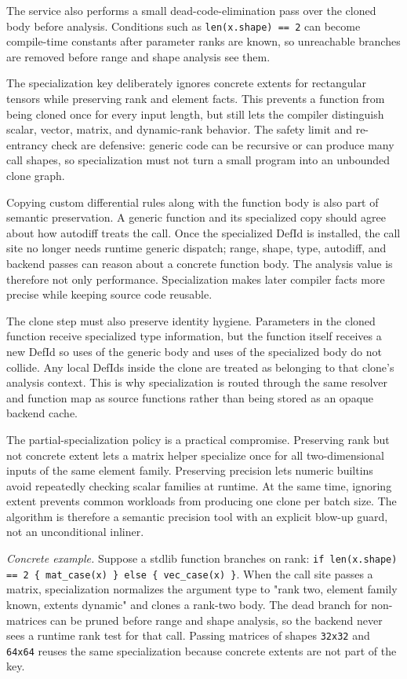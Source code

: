 The service also performs a small dead-code-elimination pass over the cloned
body before analysis. Conditions such as \texttt{len(x.shape) == 2} can become
compile-time constants after parameter ranks are known, so unreachable branches
are removed before range and shape analysis see them.

The specialization key deliberately ignores concrete extents for rectangular
tensors while preserving rank and element facts. This prevents a function from
being cloned once for every input length, but still lets the compiler
distinguish scalar, vector, matrix, and dynamic-rank behavior. The safety limit
and re-entrancy check are defensive: generic code can be recursive or can
produce many call shapes, so specialization must not turn a small program into
an unbounded clone graph.

Copying custom differential rules along with the function body is also part of
semantic preservation. A generic function and its specialized copy should agree
about how autodiff treats the call. Once the specialized DefId is installed,
the call site no longer needs runtime generic dispatch; range, shape, type,
autodiff, and backend passes can reason about a concrete function body. The
analysis value is therefore not only performance. Specialization makes later
compiler facts more precise while keeping source code reusable.

The clone step must also preserve identity hygiene. Parameters in the cloned
function receive specialized type information, but the function itself receives
a new DefId so uses of the generic body and uses of the specialized body do not
collide. Any local DefIds inside the clone are treated as belonging to that
clone's analysis context. This is why specialization is routed through the same
resolver and function map as source functions rather than being stored as an
opaque backend cache.

The partial-specialization policy is a practical compromise. Preserving rank but
not concrete extent lets a matrix helper specialize once for all two-dimensional
inputs of the same element family. Preserving precision lets numeric builtins
avoid repeatedly checking scalar families at runtime. At the same time, ignoring
extent prevents common workloads from producing one clone per batch size. The
algorithm is therefore a semantic precision tool with an explicit blow-up
guard, not an unconditional inliner.

\textit{Concrete example.} Suppose a stdlib function branches on rank:
\texttt{if len(x.shape) == 2 \{ mat\_case(x) \} else \{ vec\_case(x) \}}. When
the call site passes a matrix, specialization normalizes the argument type to
"rank two, element family known, extents dynamic" and clones a rank-two body.
The dead branch for non-matrices can be pruned before range and shape analysis,
so the backend never sees a runtime rank test for that call. Passing matrices
of shapes \texttt{32x32} and \texttt{64x64} reuses the same specialization
because concrete extents are not part of the key.

